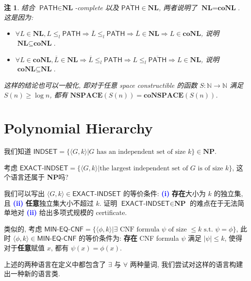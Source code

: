 \documentclass[8pt]{article}
\theoremstyle{compact}
\newtheorem{remark}[theorem]{注}
\def\num#1{\textnormal{\textbf{\mbox{\textcolor{blue}{(#1)}}}}}
\def\le{\leqslant}
\def\ge{\geqslant}
\def\NP{\textbf{NP}}
\def\NSPACE{\textbf{NSPACE}}
\def\NL{\textbf{NL}}
\def\coNL{\textbf{coNL}}
\begin{document}
\begin{remark}
	结合 $\textsf{PATH} \in \NL$-complete 以及 $\overline{\textsf{PATH}} \in \NL$, 两者说明了 $\NL = \coNL$. 这是因为:
	\begin{itemize}
		\item $\forall L \in \NL, L \le_l \textsf{PATH} \Rightarrow \overline{L} \le_l \overline{\textsf{PATH}} \Rightarrow \overline{L} \in \NL \Rightarrow L \in \coNL$, 说明 $\NL \subseteq \coNL$.
		\item $\forall L \in \coNL, \overline{L} \in \NL \Rightarrow \overline{L} \le_l \textsf{PATH} \Rightarrow L \le_l \overline{\textsf{PATH}} \Rightarrow L \in \NL$, 说明 $\coNL \subseteq \NL$.
	\end{itemize}
	
	这样的结论也可以一般化, 即对于任意 space constructible 的函数 $S : \mathbb N \to \mathbb N$ 满足 $S(n) \ge \log n$, 都有 $\NSPACE(S(n)) = \textbf{coNSPACE}(S(n))$.
\end{remark}



\newpage
\section{Polynomial Hierarchy}

我们知道 $\textsf{INDSET} = \{\langle G, k \rangle | G \text{ has an independent set of size } k\} \in \NP$. 

考虑 $\textsf{EXACT-INDSET} = \{\langle G, k \rangle | \text{the largest independent set of } G \text{ is of size } k\}$, 这个语言还属于 \NP 吗?

我们可以写出 $\langle G, k \rangle \in \textsf{EXACT-INDSET}$ 的等价条件: \num{i} \textbf{存在}大小为 $k$ 的独立集, 且 \num{ii} \textbf{任意}独立集大小不超过 $k$. 证明 $\textsf{EXACT-INDSET} \in \NP$ 的难点在于无法简单地对 \num{ii} 给出多项式规模的 certificate.

类似的, 考虑 $\textsf{MIN-EQ-CNF} = \{\langle\phi, k\rangle | \exists \text{ CNF formula } \psi \text{ of size } \le k \text{ s.t. } \psi = \phi\}$, 此时 $\langle \phi, k \rangle \in \textsf{MIN-EQ-CNF}$ 的等价条件为: \textbf{存在} CNF formula $\psi$ 满足 $|\psi| \le k$, 使得对于\textbf{任意}赋值 $x$, 都有 $\psi(x) = \phi(x)$.

上述的两种语言在定义中都包含了 $\exists$ 与 $\forall$ 两种量词, 我们尝试对这样的语言构建出一种新的语言类.
\end{document}
